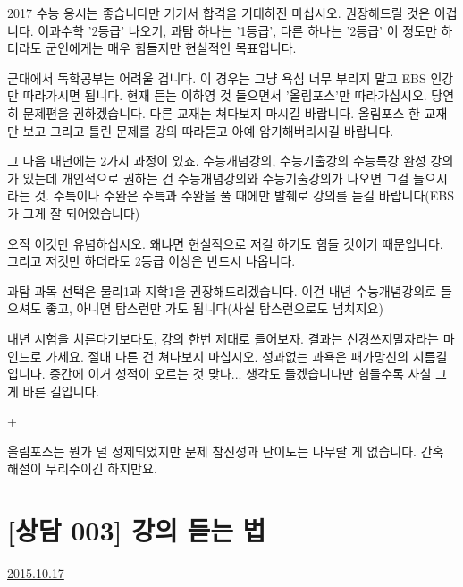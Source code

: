 2017 수능 응시는 좋습니다만 거기서 합격을 기대하진 마십시오.
권장해드릴 것은 이겁니다.
이과수학 '2등급' 나오기, 과탐 하나는 '1등급', 다른 하나는 '2등급'
이 정도만 하더라도 군인에게는 매우 힘들지만 현실적인 목표입니다.
\vspace{5mm}

군대에서 독학공부는 어려울 겁니다. 이 경우는 그냥 욕심 너무 부리지 말고 EBS 인강만 따라가시면 됩니다.
현재 듣는 이하영 것 들으면서 '올림포스'만 따라가십시오. 당연히 문제편을 권하겠습니다.
다른 교재는 쳐다보지 마시길 바랍니다.  올림포스 한 교재만 보고 그리고 틀린 문제를 강의 따라듣고 아예 암기해버리시길 바랍니다.
\vspace{5mm}

그 다음 내년에는 2가지 과정이 있죠. 수능개념강의, 수능기출강의 수능특강 완성 강의가 있는데
개인적으로 권하는 건 수능개념강의와 수능기출강의가 나오면 그걸 들으시라는 것.
수특이나 수완은 수특과 수완을 풀 때에만 발췌로 강의를 듣길 바랍니다(EBS가 그게 잘 되어있습니다)
\vspace{5mm}

오직 이것만 유념하십시오. 왜냐면 현실적으로 저걸 하기도 힘들 것이기 때문입니다. 그리고 저것만 하더라도 2등급 이상은 반드시 나옵니다.
\vspace{5mm}

과탐 과목 선택은 물리1과 지학1을 권장해드리겠습니다.
이건 내년 수능개념강의로 들으셔도 좋고, 아니면 탐스런만 가도 됩니다(사실 탐스런으로도 넘치지요)
\vspace{5mm}

내년 시험을 치른다기보다도, 강의 한번 제대로 들어보자. 결과는 신경쓰지말자라는 마인드로 가세요.
절대 다른 건 쳐다보지 마십시오. 성과없는 과욕은 패가망신의 지름길입니다.
중간에 이거 성적이 오르는 것 맞나... 생각도 들겠습니다만 힘들수록 사실 그게 바른 길입니다.
\vspace{5mm}

+
\vspace{5mm}

올림포스는 뭔가 덜 정제되었지만 문제 참신성과 난이도는 나무랄 게 없습니다. 간혹 해설이 무리수이긴 하지만요.
\vspace{5mm}






\section{[상담 003] 강의 듣는 법}
\href{https://www.kockoc.com/Apoc/420984}{2015.10.17}



